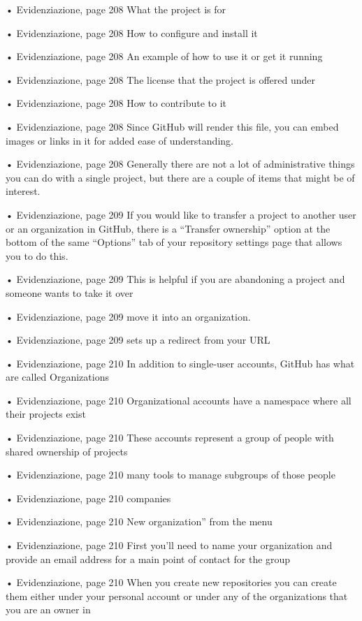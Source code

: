 • Evidenziazione, page 208
What the project is for

• Evidenziazione, page 208
How to configure and install it

• Evidenziazione, page 208
An example of how to use it or get it running

• Evidenziazione, page 208
The license that the project is offered under

• Evidenziazione, page 208
How to contribute to it

• Evidenziazione, page 208
Since GitHub will render this file, you can embed images or links in it for added ease of understanding.

• Evidenziazione, page 208
Generally there are not a lot of administrative things you can do with a single project, but there are a couple of items that might be of interest.

• Evidenziazione, page 209
If you would like to transfer a project to another user or an organization in GitHub, there is a “Transfer ownership” option at the bottom of the same “Options” tab of your repository settings page that allows you to do this.

• Evidenziazione, page 209
This is helpful if you are abandoning a project and someone wants to take it over

• Evidenziazione, page 209
move it into an organization.

• Evidenziazione, page 209
sets up a redirect from your URL

• Evidenziazione, page 210
In addition to single-user accounts, GitHub has what are called Organizations

• Evidenziazione, page 210
Organizational accounts have a namespace where all their projects exist

• Evidenziazione, page 210
These accounts represent a group of people with shared ownership of projects

• Evidenziazione, page 210
many tools to manage subgroups of those people

• Evidenziazione, page 210
companies

• Evidenziazione, page 210
New organization” from the menu

• Evidenziazione, page 210
First you’ll need to name your organization and provide an email address for a main point of contact for the group

• Evidenziazione, page 210
When you create new repositories you can create them either under your personal account or under any of the organizations that you are an owner in

